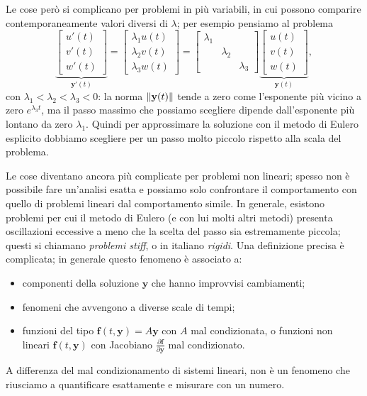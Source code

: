 \documentclass[a4paper]{report}
\DeclarePairedDelimiter{\norm}{\lVert}{\rVert}
\theoremstyle{definiton}
\theoremstyle{remark}
\newcommand{\y}{\mathbf{y}}
\begin{document}
Le cose però si complicano per problemi in più variabili, in cui possono comparire contemporaneamente valori diversi di $\lambda$; per esempio pensiamo al problema
\[
\underbrace{
\begin{bmatrix}
    u'(t)\\
    v'(t)\\
    w'(t)
\end{bmatrix}}_{\y'(t)} = \begin{bmatrix}
    \lambda_1 u(t)\\
    \lambda_2 v(t)\\
    \lambda_3 w(t)
\end{bmatrix} = \begin{bmatrix}
    \lambda_1 \\ 
    & \lambda_2\\
    && \lambda_3
\end{bmatrix} \underbrace{\begin{bmatrix}
    u(t)\\ v(t)\\ w(t)
\end{bmatrix}}_{\y(t)},
\]
con $\lambda_1 < \lambda_2 < \lambda_3 < 0$: la norma $\norm{\y(t)}$ tende a zero come l'esponente più vicino a zero $e^{\lambda_3 t}$, ma il passo massimo che possiamo scegliere dipende dall'esponente più lontano da zero $\lambda_1$. Quindi per approssimare la soluzione con il metodo di Eulero esplicito dobbiamo scegliere per un passo molto piccolo rispetto alla scala del problema.

Le cose diventano ancora più complicate per problemi non lineari; spesso non è possibile fare un'analisi esatta e possiamo solo confrontare il comportamento con quello di problemi lineari dal comportamento simile. In generale, esistono problemi per cui il metodo di Eulero (e con lui molti altri metodi) presenta oscillazioni eccessive a meno che la scelta del passo sia estremamente piccola; questi si chiamano \emph{problemi stiff}, o in italiano \emph{rigidi}. Una definizione precisa è complicata; in generale questo fenomeno è associato a:
\begin{itemize}
    \item componenti della soluzione $\y$ che hanno improvvisi cambiamenti;
    \item fenomeni che avvengono a diverse scale di tempi;
    \item funzioni del tipo $\mathbf{f}(t,\y)=A\y$ con $A$ mal condizionata, o funzioni non lineari $\mathbf{f}(t,\y)$ con Jacobiano $\frac{\partial \mathbf{f}}{\partial \mathbf{y}}$ mal condizionato.
\end{itemize}
A differenza del mal condizionamento di sistemi lineari, non è un fenomeno che riusciamo a quantificare esattamente e misurare con un numero.
\end{document}
